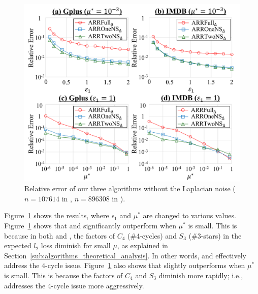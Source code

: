 \begin{figure}[t]
  \centering
  \includegraphics[width=0.99\linewidth]{fig/res1_wo_Lap.pdf}
  \vspace{-5mm}
  \caption{Relative error of our three algorithms without the Laplacian noise 
  ($n=107614$ in \GPlus{}, $n=896308$ in \IMDB{}).} 
  \label{fig:res1_wo_Lap}
\end{figure}

Figure~\ref{fig:res1_wo_Lap} shows the results, where 
$\epsilon_1$ and 
$\mu^*$ 
are changed to various values. 
Figure~\ref{fig:res1_wo_Lap} shows that \AlgTwo{} and \AlgThree{} significantly outperform \AlgOne{} when 
$\mu^*$ 
is small. 
This is because in both \AlgTwo{} and \AlgThree{}, 
the factors of 
$C_4$ (\#4-cycles) and $S_3$ (\#3-stars) 
in the expected $l_2$ loss 
diminish 
for small $\mu$, 
as explained in Section~\ref{sub:algorithms_theoretical_analysis}. 
In other words, \AlgTwo{} and \AlgThree{} effectively address the $4$-cycle issue. 
Figure~\ref{fig:res1_wo_Lap} also shows that \AlgThree{} slightly outperforms \AlgTwo{} when $\mu^*$ is small. 
This is because 
the factors of $C_4$ and $S_3$ 
diminish 
more rapidly; i.e., \AlgThree{} addresses the $4$-cycle issue more aggressively. 

